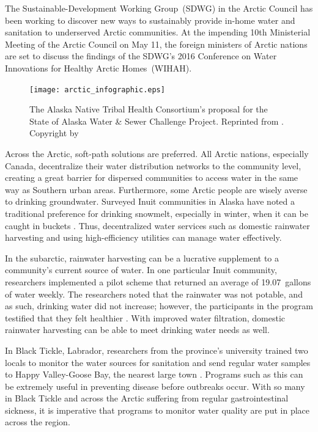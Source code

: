 \documentclass[american]{../../../coursework}
\begin{document}
The Sustainable-Development Working Group~(SDWG) in the Arctic Council has
been working to discover new ways to sustainably provide in-home water and
sanitation to underserved Arctic communities. At the impending 10th
Ministerial Meeting of the Arctic Council on May 11, the foreign ministers of
Arctic nations are set to discuss the findings of the SDWG's 2016 Conference
on Water Innovations for Healthy Arctic Homes~(WIHAH).

\begin{figure}
    \begin{center}
        \texttt{[image: arctic\_infographic.eps]}
    \end{center}
    \caption{The Alaska Native Tribal Health Consortium's proposal for the
    State of Alaska Water \& Sewer Challenge Project. Reprinted from
    . Copyright \citeyear{PASS} by \citeauthor{PASS}}%
    \label{fig:infographic}
\end{figure}

Across the Arctic, soft-path solutions are preferred. All Arctic nations,
especially Canada, decentralize their water distribution networks to the
community level, creating a great barrier for dispersed communities to access
water in the same way as Southern urban areas. Furthermore, some Arctic people
are wisely averse to drinking groundwater. Surveyed Inuit communities in
Alaska have noted a traditional preference for drinking snowmelt, especially
in winter, when it can be caught in buckets \parencite{Dotson2016}. Thus,
decentralized water services such as domestic rainwater harvesting and using
high-efficiency utilities can manage water effectively.

In the subarctic, rainwater harvesting can be a lucrative supplement to a
community's current source of water. In one particular Inuit community,
researchers implemented a pilot scheme that returned an average of
19.07~gallons of water weekly. The researchers noted that the rainwater was
not potable, and as such, drinking water did not increase; however, the
participants in the program testified that they felt healthier
\parencite{Mercer2017}. With improved water filtration, domestic rainwater
harvesting can be able to meet drinking water needs as well.

In Black Tickle, Labrador, researchers from the province's university trained
two locals to monitor the water sources for sanitation and send regular water
samples to Happy Valley-Goose Bay, the nearest large town
\parencite{Hanrahan2014}. Programs such as this can be extremely useful in
preventing disease before outbreaks occur. With so many in Black Tickle and
across the Arctic suffering from regular gastrointestinal sickness, it is
imperative that programs to monitor water quality are put in place across the
region.
\end{document}
